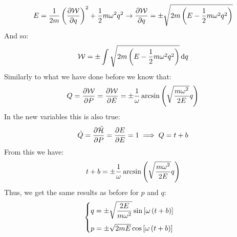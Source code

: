 \begin{equation}
  E = \dfrac{1}{2m} \brackets{\pdv{\hamch}{q}}^2 + \dfrac{1}{2}m\omega^2q^2 \rightarrow \pdv{\hamch}{q} = \pm \sqrt{2m\brackets{E - \dfrac{1}{2}m\omega^2q^2}}
\end{equation}
And so:
\begin{equation}
  \mathcal{W} = \pm \int  \sqrt{2m\left(E - \dfrac{1}{2}m\omega^2q^2\right)} \dd{q}
\end{equation}
Similarly to what we have done before we know that:
\begin{equation}
  Q = \pdv{\hamch}{P} = \pdv{\hamch}{E} = \pm \dfrac{1}{\omega} \arcsin \brackets{\sqrt{\dfrac{m\omega^2}{2E}}q}
\end{equation}
In the new variables this is also true:
\begin{equation}
  \dot{Q} = \pdv{\tilde{\hamfun}}{P} = \pdv{E}{E} = 1 \implies Q = t + b
\end{equation}
From this we have:
\begin{equation}
  t + b = \pm \dfrac{1}{\omega} \arcsin \left(\sqrt{\dfrac{m\omega^2}{2E}}q\right)
\end{equation}
Thus, we get the same results as before for $p$ and $q$:
\begin{equation}
  \begin{cases}
    q = \pm \sqrt{\dfrac{2E}{m\omega^2}} \sin \left[\omega\left( t + b\right)\right]\\[10pt]
    p = \pm \sqrt{2mE} \cos \left[\omega\left( t + b\right)\right]
  \end{cases}
\end{equation}
